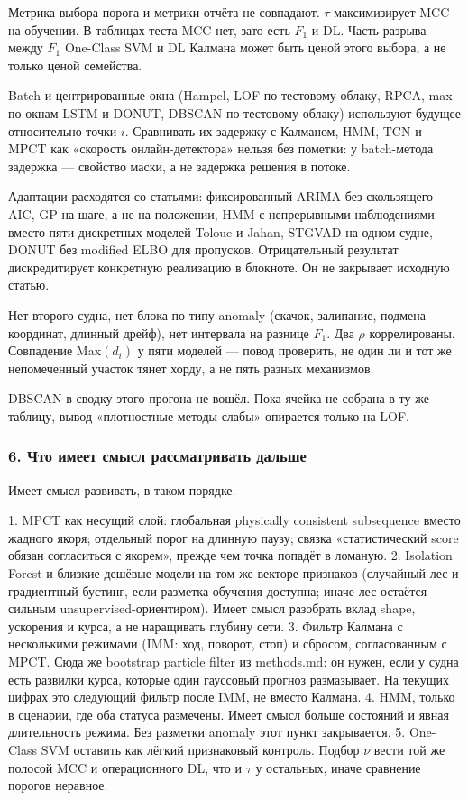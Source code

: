 \documentclass[a4paper,12pt]{report}
\begin{document}
Метрика выбора порога и метрики отчёта не совпадают. $\tau$ максимизирует MCC на обучении. В таблицах теста MCC нет, зато есть $F_1$ и DL. Часть разрыва между $F_1$ One-Class SVM и DL Калмана может быть ценой этого выбора, а не только ценой семейства.

Batch и центрированные окна (Hampel, LOF по тестовому облаку, RPCA, max по окнам LSTM и DONUT, DBSCAN по тестовому облаку) используют будущее относительно точки $i$. Сравнивать их задержку с Калманом, HMM, TCN и MPCT как «скорость онлайн-детектора» нельзя без пометки: у batch-метода задержка — свойство маски, а не задержка решения в потоке.

Адаптации расходятся со статьями: фиксированный ARIMA без скользящего AIC, GP на шаге, а не на положении, HMM с непрерывными наблюдениями вместо пяти дискретных моделей Toloue и Jahan, STGVAD на одном судне, DONUT без modified ELBO для пропусков. Отрицательный результат дискредитирует конкретную реализацию в блокноте. Он не закрывает исходную статью.

Нет второго судна, нет блока по типу anomaly (скачок, залипание, подмена координат, длинный дрейф), нет интервала на разнице $F_1$. Два $\rho$ коррелированы. Совпадение Max$(d_i)$ у пяти моделей — повод проверить, не один ли и тот же непомеченный участок тянет хорду, а не пять разных механизмов.

DBSCAN в сводку этого прогона не вошёл. Пока ячейка не собрана в ту же таблицу, вывод «плотностные методы слабы» опирается только на LOF.

\subsubsection{6. Что имеет смысл рассматривать дальше}

Имеет смысл развивать, в таком порядке.

1. MPCT как несущий слой: глобальная physically consistent subsequence вместо жадного якоря; отдельный порог на длинную паузу; связка «статистический score обязан согласиться с якорем», прежде чем точка попадёт в ломаную.
2. Isolation Forest и близкие дешёвые модели на том же векторе признаков (случайный лес и градиентный бустинг, если разметка обучения доступна; иначе лес остаётся сильным unsupervised-ориентиром). Имеет смысл разобрать вклад shape, ускорения и курса, а не наращивать глубину сети.
3. Фильтр Калмана с несколькими режимами (IMM: ход, поворот, стоп) и сбросом, согласованным с MPCT. Сюда же bootstrap particle filter из methods.md: он нужен, если у судна есть развилки курса, которые один гауссовый прогноз размазывает. На текущих цифрах это следующий фильтр после IMM, не вместо Калмана.
4. HMM, только в сценарии, где оба статуса размечены. Имеет смысл больше состояний и явная длительность режима. Без разметки anomaly этот пункт закрывается.
5. One-Class SVM оставить как лёгкий признаковый контроль. Подбор $\nu$ вести той же полосой MCC и операционного DL, что и $\tau$ у остальных, иначе сравнение порогов неравное.
\end{document}
